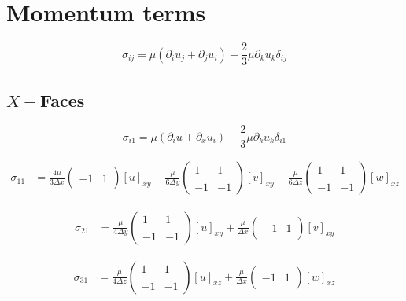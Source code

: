 \documentclass{article}
\begin{document}
\section{Momentum terms}

\begin{equation*}
  \sigma_{ij} = \mu\left(\partial_i u_j + \partial_j u_i\right) - \frac{2}{3}\mu\partial_k u_k\delta_{ij}
\end{equation*}

\subsection{$X-$Faces}
\begin{equation*}
  \sigma_{i1} = \mu\left(\partial_i u + \partial_x u_i\right) - \frac{2}{3}\mu\partial_k u_k\delta_{i1}
\end{equation*}

\begin{align*}
  \sigma_{11} &= \frac{4\mu}{3\Delta x}\begin{pmatrix} & \\ -1 & 1 \\ & \end{pmatrix}[u]_{xy} - \frac{\mu}{6\Delta y}\begin{pmatrix} 1 & 1 \\ & \\ -1 & -1 \end{pmatrix}[v]_{xy} - \frac{\mu}{6\Delta z}\begin{pmatrix} 1 & 1 \\ & \\ -1 & -1 \end{pmatrix}[w]_{xz}
\end{align*}

\begin{align*}
  \sigma_{21} &= \frac{\mu}{4\Delta y}\begin{pmatrix} 1 & 1 \\ & \\ -1 & -1 \end{pmatrix}[u]_{xy} + \frac{\mu}{\Delta x}\begin{pmatrix} & \\ -1 & 1 \\ & \end{pmatrix}[v]_{xy}
\end{align*}

\begin{align*}
  \sigma_{31} &= \frac{\mu}{4\Delta z}\begin{pmatrix} 1 & 1 \\ & \\ -1 & -1 \end{pmatrix}[u]_{xz} + \frac{\mu}{\Delta x}\begin{pmatrix} & \\ -1 & 1 \\ & \end{pmatrix}[w]_{xz}
\end{align*}
\end{document}
